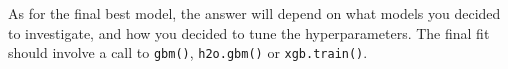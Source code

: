 \documentclass[
]{article}
\newenvironment{Shaded}{\begin{snugshade}}{\end{snugshade}}
\newcommand{\CommentTok}[1]{\textcolor[rgb]{0.56,0.35,0.01}{\textit{#1}}}
\newcommand{\DecValTok}[1]{\textcolor[rgb]{0.00,0.00,0.81}{#1}}
\newcommand{\FunctionTok}[1]{\textcolor[rgb]{0.13,0.29,0.53}{\textbf{#1}}}
\newcommand{\NormalTok}[1]{#1}
\newcommand{\SpecialCharTok}[1]{\textcolor[rgb]{0.81,0.36,0.00}{\textbf{#1}}}
\begin{document}
\begin{Shaded}
\end{Shaded}

As for the final best model, the answer will depend on what models you
decided to investigate, and how you decided to tune the hyperparameters.
The final fit should involve a call to \texttt{gbm()},
\texttt{h2o.gbm()} or \texttt{xgb.train()}.
\end{document}
